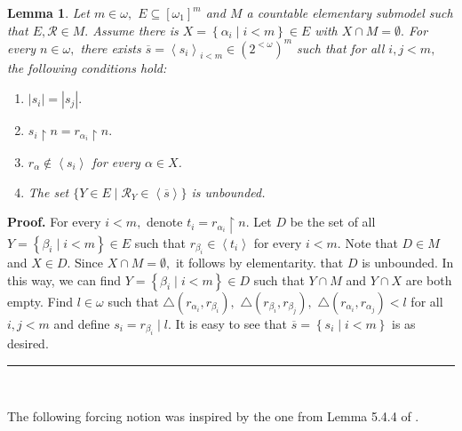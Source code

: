 \documentclass{article}
\newtheorem{lemma}[theorem]{Lemma}
\newenvironment{proof}[1][Proof]{\noindent\textbf{#1.} }{\ \rule{0.5em}{0.5em}}
\begin{document}
\begin{lemma}
Let $m\in\omega,$ $E\subseteq\left[  \omega_{1}\right]  ^{m}$ and $M$ a
countable elementary submodel such that $E,\mathcal{R}\in M.$ Assume there is
$X=\left\{  \alpha_{i}\mid i<m\right\}  \in E$ with $X\cap M=\emptyset.$ For
every $n\in\omega,$ there exists $\overline{s}=\left\langle s_{i}\right\rangle
_{i<m}\in\left(  2^{<\omega}\right)  ^{m}$ such that for all $i,j<m,$ the
following conditions hold: \label{Lema PFA reales}

\begin{enumerate}
\item $\left\vert s_{i}\right\vert =\left\vert s_{j}\right\vert .$

\item $s_{i}\upharpoonright n=r_{\alpha_{i}}\upharpoonright n.$

\item $r_{\alpha}\notin\left\langle s_{i}\right\rangle $ for every $\alpha\in
X$.

\item The set $\{Y\in E\mid\mathcal{R}_{Y}\in\left\langle \overline
{s}\right\rangle \}$ is unbounded.
\end{enumerate}
\end{lemma}

\begin{proof}
For every $i<m,$ denote $t_{i}=r_{\alpha_{i}}\upharpoonright n.$ Let $D$ be
the set of all $Y=\left\{  \beta_{i}\mid i<m\right\}  \in E$ such that
$r_{\beta_{i}}\in\left\langle t_{i}\right\rangle $ for every $i<m.$ Note that
$D\in M$ and $X\in D.$ Since $X\cap M=\emptyset,$ it follows by elementarity.
that $D$ is unbounded. In this way, we can find $Y=\left\{  \beta_{i}\mid
i<m\right\}  \in D$ such that $Y\cap M$ and $Y\cap X$ are both empty. Find
$l\in\omega$ such that $\triangle(r_{\alpha_{i}},r_{\beta_{i}}),$
$\triangle\left(  r_{\beta_{i}},r_{\beta_{j}}\right)  ,$ $\triangle\left(
r_{\alpha_{i}},r_{\alpha_{j}}\right)  <l$ for all $i,j<m$ and define
$s_{i}=r_{\beta_{i}}\mid l.$ It is easy to see that $\overline{s}=\left\{
s_{i}\mid i<m\right\}  $ is as desired.
\end{proof}

\qquad\ \ \ \ \ \qquad\ \qquad\ \ 

The following forcing notion was inspired by the one from Lemma 5.4.4 of
\cite{Walks}.
\end{document}
